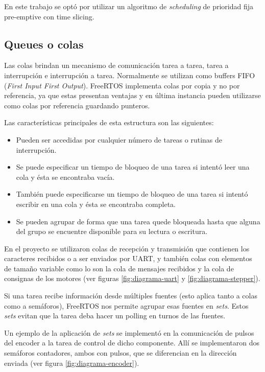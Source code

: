 \documentclass{IEEEtran}
\begin{document}
En este trabajo se optó por utilizar un algoritmo de \textit{scheduling} de prioridad fija pre-emptive con time slicing.

\subsection{Queues o colas}
Las colas brindan un mecanismo de comunicación tarea a tarea, tarea a interrupción e interrupción a tarea. Normalmente se utilizan como buffers FIFO (\textit{First Input First Output}). FreeRTOS implementa colas por copia y no por referencia, ya que estas presentan ventajas y en última instancia pueden utilizarse como colas por referencia guardando punteros.

Las características principales de esta estructura son las siguientes:

\begin{itemize}
    \item Pueden ser accedidas por cualquier número de tareas o rutinas de interrupción.
    \item Se puede especificar un tiempo de bloqueo de una tarea si intentó leer una cola y ésta se encontraba vacía.
    \item También puede especificarse un tiempo de bloqueo de una tarea si intentó escribir en una cola y ésta se encontraba completa.
    \item Se pueden agrupar de forma que una tarea quede bloqueada hasta que alguna del grupo se encuentre disponible para su lectura o escritura.
\end{itemize}

En el proyecto se utilizaron colas de recepción y transmisión que contienen los caracteres recibidos o a ser enviados por UART, y también colas con elementos de tamaño variable como lo son la cola de mensajes recibidos y la cola de consignas de los motores (ver figuras \ref{fig:diagrama-uart} y \ref{fig:diagrama-stepper}).

Si una tarea recibe información desde múltiples fuentes (esto aplica tanto a colas como a semáforos), FreeRTOS nos permite agrupar esas fuentes en \textit{sets}. Estos \textit{sets} evitan que la tarea deba hacer un polling en turnos de las fuentes.

Un ejemplo de la aplicación de \textit{sets} se implementó en la comunicación de pulsos del encoder a la tarea de control de dicho componente. Allí se implementaron dos semáforos contadores, ambos con pulsos, que se diferencian en la dirección enviada (ver figura \ref{fig:diagrama-encoder}).
\end{document}
